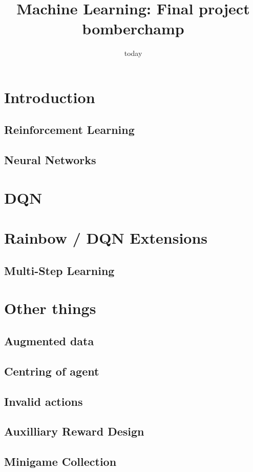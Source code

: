 \documentclass[12pt]{article}
\title{Machine Learning: Final project bomberchamp}
\date{today}
\begin{document}
\section{Introduction}

\subsection{Reinforcement Learning}

\subsection{Neural Networks}

\section{DQN}


\section{Rainbow / DQN Extensions}

\subsection{Multi-Step Learning} %
% 

\section{Other things}
\subsection{Augmented data}
\subsection{Centring of agent} %
\subsection{Invalid actions} %
\subsection{Auxilliary Reward Design}
\subsection{Minigame Collection} %
\end{document}
